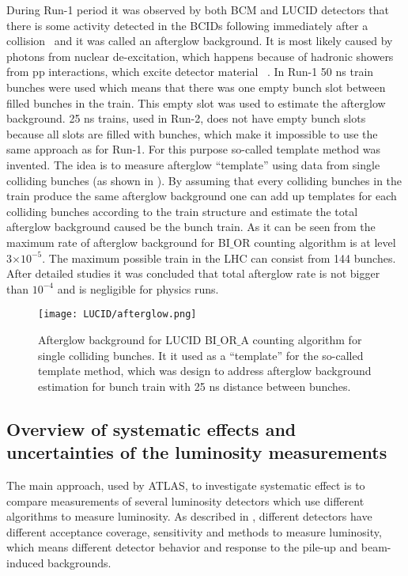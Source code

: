 During Run-1 period it was observed by both BCM and LUCID detectors that there is some activity detected in the BCIDs following immediately after a collision~\cite{Aad:2011dr,Aad:2013ucp}
and it was called an afterglow background. It is most likely caused by photons from nuclear de-excitation, which happens because of hadronic showers from pp interactions, which excite detector material ~\cite{Aaboud:2016hhf}.
In Run-1 50 ns train bunches were used which means that there was one empty bunch slot between filled bunches in the train.
This empty slot was used to estimate the afterglow background.
25 ns trains, used in Run-2, does not have empty bunch slots because all slots are filled with bunches, which make it impossible to use the same approach as for Run-1.
For this purpose so-called template method was invented. The idea is to measure afterglow ``template'' using data from single colliding bunches (as shown in ).
By assuming that every colliding bunches in the train produce the same afterglow background one can add up templates for each colliding bunches according to the train structure and estimate the total afterglow background caused be the bunch train. As it can be seen from  the maximum rate of afterglow background for BI$\_$OR counting algorithm is at level 
3$\times10^{-5}$. The maximum possible train in the LHC can consist from 144 bunches. After detailed studies it was concluded that total afterglow rate is not bigger than $10^{-4}$ and is 
negligible for physics runs.
\begin{figure}
\centering
\texttt{[image: LUCID/afterglow.png]}
\caption{Afterglow background for LUCID BI$\_$OR$\_$A counting algorithm for single colliding bunches. It it used as a ``template'' for the so-called template method, which was design
to address afterglow background estimation for bunch train with 25 ns distance between bunches.}
\label{fig:afterglow}
\end{figure}

\subsection{Overview of systematic effects and uncertainties of the luminosity measurements}

The main approach, used by ATLAS, to investigate systematic effect is to compare measurements of several luminosity detectors which use different algorithms to measure luminosity.
As described in , different detectors have different acceptance coverage, sensitivity and methods to measure luminosity, which means different detector behavior and response to the pile-up and beam-induced backgrounds.

